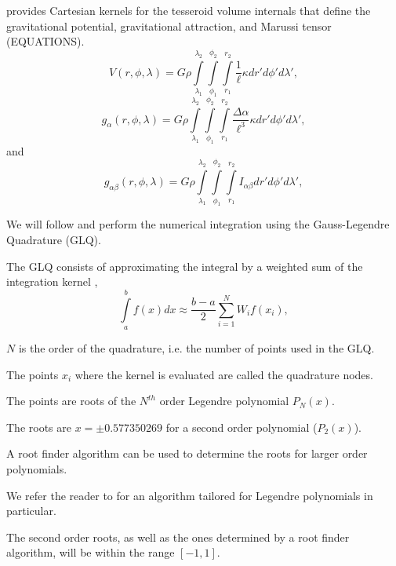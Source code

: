 \documentclass[paper,twocolumn]{geophysics}
\begin{document}
\citet{Grombein2013} provides Cartesian kernels for the tesseroid volume
internals that define the gravitational potential, gravitational attraction,
and Marussi tensor (EQUATIONS).
\begin{equation}
    V(r,\phi,\lambda) = G \rho
        \int\limits_{\lambda_1}^{\lambda_2}
        \int\limits_{\phi_1}^{\phi_2}
        \int\limits_{r_1}^{r_2}
        \frac{1}{\ell} \kappa  dr' d\phi' d\lambda',
    \label{eq:tesspot}
\end{equation}
\begin{equation}
    g_{\alpha}(r,\phi,\lambda) = G \rho
        \int\limits_{\lambda_1}^{\lambda_2}
        \int\limits_{\phi_1}^{\phi_2}
        \int\limits_{r_1}^{r_2}
        \frac{\Delta\alpha}{\ell^3} \kappa dr' d\phi' d\lambda',
    \label{eq:tessgrav}
\end{equation}
\noindent
and
\begin{equation}
    g_{\alpha\beta}(r,\phi,\lambda) = G \rho
        \int\limits_{\lambda_1}^{\lambda_2}
        \int\limits_{\phi_1}^{\phi_2}
        \int\limits_{r_1}^{r_2}
        I_{\alpha\beta}
        dr' d\phi' d\lambda',
    \label{eq:tesstensor}
\end{equation}

We will follow \citet{Asgharzadeh2007} and perform the numerical integration
using the Gauss-Legendre Quadrature (GLQ).

The GLQ consists of approximating the integral by a weighted sum of the
integration kernel \citep{Hildebrand1987},
\begin{equation}
    \int\limits_a^b f(x) dx \approx
    \frac{b-a}{2}\sum\limits_{i=1}^N W_i f(x_i),
    \label{eq:glq1d}
\end{equation}

$N$ is the order of the quadrature, i.e. the number of points used in the GLQ.

The points $x_i$ where the kernel is evaluated are called the quadrature nodes.

The points are roots of the $N^{th}$ order Legendre polynomial $P_N(x)$.

The roots are $x = \pm 0.577350269$ for a second order polynomial ($P_2(x)$).

A root finder algorithm can be used to determine the roots for larger order
polynomials.

We refer the reader to \citet{Barrera-Figueroa2006} for an algorithm tailored
for Legendre polynomials in particular.

The second order roots, as well as the ones determined by a root finder
algorithm, will be within the range $[-1, 1]$.
\end{document}
